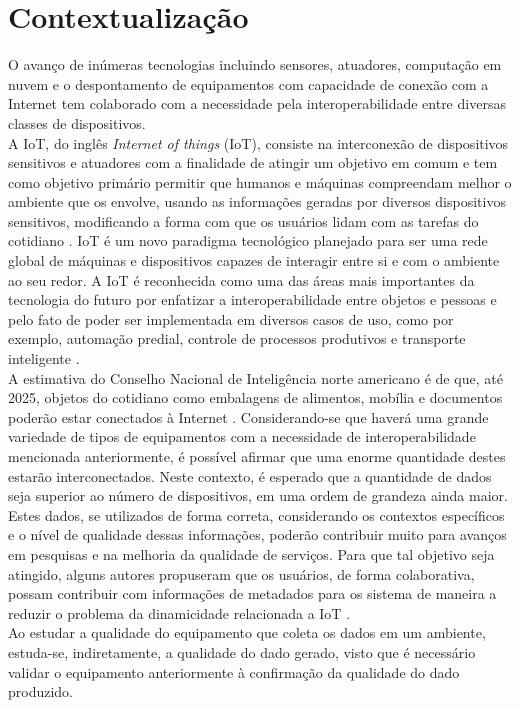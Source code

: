 \section{Contextualização}
\quad
O avanço de inúmeras tecnologias incluindo sensores, atuadores, computação em nuvem e o despontamento de equipamentos com capacidade de conexão com a Internet tem colaborado com a necessidade pela interoperabilidade entre diversas classes de dispositivos.
\\ \null
\quad
A \acrlong{IoT}, do inglês \textit{Internet of things} (\acrshort{IoT}), consiste na interconexão de dispositivos sensitivos e atuadores com a finalidade de atingir um objetivo em comum \cite{giusto} e tem como objetivo primário %
permitir que humanos e máquinas compreendam melhor o ambiente que os envolve, usando as informações geradas por
diversos dispositivos sensitivos, modificando a forma com que os usuários lidam com as tarefas do cotidiano \cite{IOTS}. \acrshort{IoT} é um novo paradigma tecnológico planejado para ser uma rede
global de máquinas e dispositivos capazes de interagir entre si e com o ambiente ao seu redor.
A \acrshort{IoT} é reconhecida como uma das áreas mais importantes da tecnologia do futuro por enfatizar a interoperabilidade entre objetos e pessoas e pelo fato de
poder ser implementada em diversos casos de uso, como por exemplo, automação predial, controle de processos produtivos e transporte inteligente \cite{IOTV}.
\\ \null
\quad A estimativa do Conselho Nacional de Inteligência norte americano é de que, até 2025, objetos do cotidiano como embalagens de alimentos, mobília e documentos
poderão estar conectados à Internet \cite{intelsix}. Considerando-se que haverá uma grande variedade de tipos de equipamentos com a necessidade de interoperabilidade mencionada anteriormente,
é possível afirmar que uma enorme quantidade destes estarão interconectados. Neste contexto,
é esperado que a quantidade de dados seja superior ao número de dispositivos, em uma ordem de grandeza ainda maior.
\\ \null
\quad Estes dados, se utilizados de forma correta, considerando os contextos específicos e o nível de qualidade dessas informações, poderão contribuir muito para avanços em pesquisas e na melhoria da qualidade de serviços. Para que tal objetivo seja atingido, alguns autores propuseram que os usuários, de forma colaborativa, possam contribuir com informações de metadados para os sistema de maneira a reduzir o problema da dinamicidade relacionada a \acrshort{IoT} \cite{collaborative}.
\\ \null \quad Ao estudar a qualidade do equipamento que coleta os dados em um ambiente, estuda-se, indiretamente, a qualidade do dado gerado, visto que é necessário validar o equipamento anteriormente à confirmação da qualidade do dado produzido.
